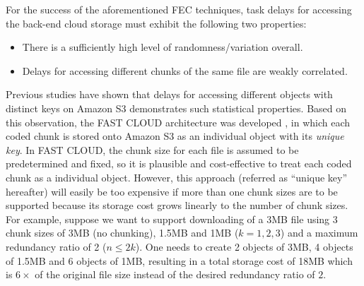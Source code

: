 \documentclass[journal]{IEEEtran}
\begin{document}
For the success of the aforementioned FEC techniques, task delays for accessing the back-end cloud storage must exhibit the following two properties: 
\begin{itemize}
\item
There is a sufficiently high level of randomness/variation overall.

\item 
Delays for accessing different chunks of the same file are weakly correlated.
\end{itemize}
Previous studies \cite{Garfinkel07anevaluation,fastcloud} have shown that delays for accessing different objects with distinct keys on Amazon S3 demonstrates such statistical properties. Based on this observation, the FAST CLOUD architecture was developed \cite{fastcloud}, in which each coded chunk is stored onto Amazon S3 as an individual object with its {\em unique key}. 
In FAST CLOUD, the chunk size for each file is assumed to be predetermined and fixed, so it is plausible and cost-effective to treat each coded chunk as a individual object. However, this approach (referred as ``unique key'' hereafter) will easily be too expensive if more than one chunk sizes are to be supported because its storage cost grows linearly to the number of chunk sizes. For example, suppose we want to support downloading of a 3MB file using 3 chunk sizes of 3MB (no chunking), 1.5MB and 1MB ($k = 1, 2, 3$) and a maximum redundancy ratio of 2 ($n\le 2k$). One needs to create 2 objects of 3MB, 4 objects of 1.5MB and 6 objects of 1MB, resulting in a total storage cost of 18MB which is $6\times$ of the original file size instead of the desired redundancy ratio of $2$.
\end{document}
